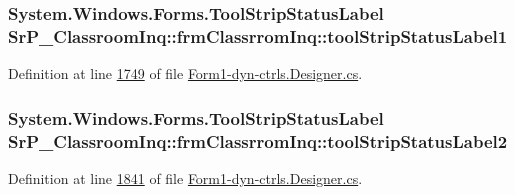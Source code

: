 \hypertarget{class_sr_p___classroom_inq_1_1frm_classrrom_inq_ad0f9f7002296a43527da34b1f476ce4e}{
\subsubsection[{tool\-Strip\-Status\-Label1}]{\setlength{\rightskip}{0pt plus 5cm}\-System.\-Windows.\-Forms.\-Tool\-Strip\-Status\-Label {\bf \-Sr\-P\-\_\-\-Classroom\-Inq\-::frm\-Classrrom\-Inq\-::tool\-Strip\-Status\-Label1}}}
\label{class_sr_p___classroom_inq_1_1frm_classrrom_inq_ad0f9f7002296a43527da34b1f476ce4e}


\-Definition at line \hyperlink{_form1-dyn-ctrls_8_designer_8cs_source_l01749}{1749} of file \hyperlink{_form1-dyn-ctrls_8_designer_8cs_source}{\-Form1-\/dyn-\/ctrls.\-Designer.\-cs}.

\hypertarget{class_sr_p___classroom_inq_1_1frm_classrrom_inq_a453e5015dbeaefcb4cab17266e8db6ad}{
\subsubsection[{tool\-Strip\-Status\-Label2}]{\setlength{\rightskip}{0pt plus 5cm}\-System.\-Windows.\-Forms.\-Tool\-Strip\-Status\-Label {\bf \-Sr\-P\-\_\-\-Classroom\-Inq\-::frm\-Classrrom\-Inq\-::tool\-Strip\-Status\-Label2}}}
\label{class_sr_p___classroom_inq_1_1frm_classrrom_inq_a453e5015dbeaefcb4cab17266e8db6ad}


\-Definition at line \hyperlink{_form1-dyn-ctrls_8_designer_8cs_source_l01841}{1841} of file \hyperlink{_form1-dyn-ctrls_8_designer_8cs_source}{\-Form1-\/dyn-\/ctrls.\-Designer.\-cs}.

